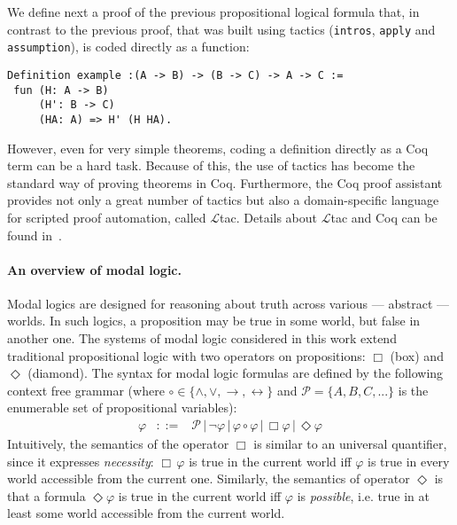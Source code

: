 \documentclass[sigconf]{acmart}
\begin{document}
We define next a proof of the previous propositional logical formula
that, in contrast to the previous proof, that was built using tactics
(\texttt{intros}, \texttt{apply} and \texttt{assumption}), is coded
directly as a function:
\begin{verbatim}
Definition example :(A -> B) -> (B -> C) -> A -> C :=
 fun (H: A -> B)
     (H': B -> C)
     (HA: A) => H' (H HA).
\end{verbatim}
However, even for very simple theorems, coding a definition directly
as a Coq term can be a hard task. Because of this, the use of tactics
has become the standard way of proving theorems in Coq. Furthermore,
the Coq proof assistant provides not only a great number of tactics
but also a domain-specific language for scripted proof automation,
called $\mathcal{L}$tac. Details about $\mathcal{L}$tac and Coq can be found
in~\cite{Chlipala13,Bertot10,manual_coq}.

\paragraph{An overview of modal logic.} Modal logics are designed for reasoning
about truth across various --- abstract --- worlds. In such logics, a
proposition may be true in some world, but false in another one. The systems of
modal logic considered in this work extend traditional propositional logic
with two operators on propositions: $\Box$ (box) and $\Diamond$ (diamond).
The syntax for modal logic formulas are defined by the following context free
grammar (where $\circ \in\{\land,\lor,\to,\leftrightarrow\}$ and
$\mathcal{P} = \{A,B,C,...\}$ is the enumerable set of propositional variables):
\[
  \begin{array}{lcl}
    \varphi & ::= & \mathcal{P}\,|\,\neg\varphi\,|\,\varphi\circ\varphi\,|\,\Box\varphi\,|\,\Diamond\varphi
  \end{array}  
\]
Intuitively, the semantics of the operator $\Box$ is similar to an universal
quantifier, since it expresses \emph{necessity}: $\Box\,\varphi$ is true in the
current world iff $\varphi$ is true in every world accessible from the current
one. Similarly, the semantics of operator
$\Diamond$ is that a formula $\Diamond\varphi$ is true in the current
world iff $\varphi$ is \emph{possible}, i.e. true in at least some world
accessible from the current world.
\end{document}
